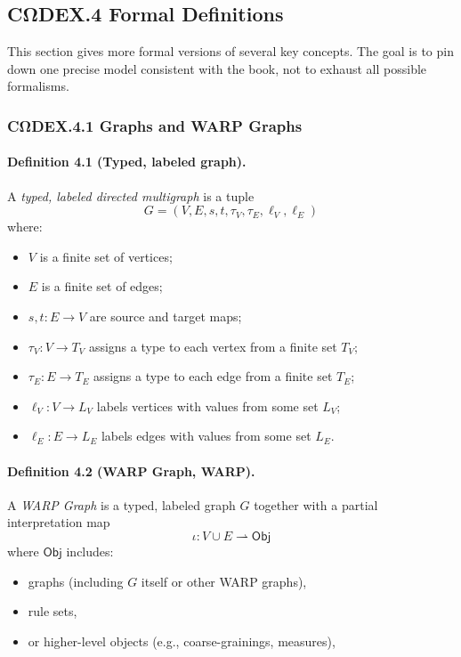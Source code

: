 \subsection*{CΩDEX.4 \quad Formal Definitions}

This section gives more formal versions of several key concepts. The goal
is to pin down one precise model consistent with the book, not to exhaust
all possible formalisms.

\subsubsection*{CΩDEX.4.1 \quad Graphs and WARP Graphs}

\paragraph{Definition 4.1 (Typed, labeled graph).}
A \emph{typed, labeled directed multigraph} is a tuple
\[
  G = (V, E, s, t, \tau_V, \tau_E, \ell_V, \ell_E)
\]
where:

\begin{itemize}
  \item $V$ is a finite set of vertices;
  \item $E$ is a finite set of edges;
  \item $s,t : E \to V$ are source and target maps;
  \item $\tau_V : V \to T_V$ assigns a type to each vertex from a finite set $T_V$;
  \item $\tau_E : E \to T_E$ assigns a type to each edge from a finite set $T_E$;
  \item $\ell_V : V \to L_V$ labels vertices with values from some set $L_V$;
  \item $\ell_E : E \to L_E$ labels edges with values from some set $L_E$.
\end{itemize}

\paragraph{Definition 4.2 (WARP Graph, WARP).}
A \emph{WARP Graph} is a typed, labeled graph $G$ together with
a partial interpretation map
\[
  \iota : V \cup E \rightharpoonup \mathsf{Obj}
\]
where $\mathsf{Obj}$ includes:

\begin{itemize}
  \item graphs (including $G$ itself or other WARP graphs),
  \item rule sets,
  \item or higher-level objects (e.g., coarse-grainings, measures),
\end{itemize}

